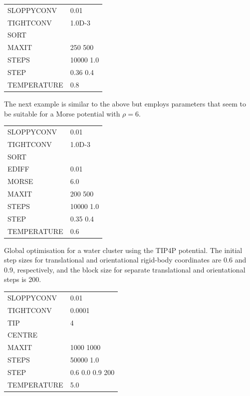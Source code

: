 {\medskip
\begin{tabular}{ll}
SLOPPYCONV & 0.01 \\
TIGHTCONV & 1.0D-3 \\
SORT \\
MAXIT & 250 500 \\
STEPS & 10000 1.0 \\
STEP & 0.36 0.4 \\
TEMPERATURE & 0.8 \\
\end{tabular}
\medskip

\noindent The next example is similar to the above but employs parameters that seem
to be suitable for a Morse potential with $\rho=6$.

\medskip
\begin{tabular}{ll}
SLOPPYCONV & 0.01 \\
TIGHTCONV & 1.0D-3 \\
SORT \\
EDIFF & 0.01\\
MORSE & 6.0\\
MAXIT & 200 500\\
STEPS & 10000 1.0\\
STEP & 0.35 0.4\\
TEMPERATURE & 0.6\\
\end{tabular}
\medskip

\noindent Global optimisation for a water cluster using the TIP4P potential.
The initial step sizes for translational and orientational rigid-body coordinates are
0.6 and 0.9, respectively, and the block size for separate translational and orientational
steps is 200.

\medskip
\begin{tabular}{ll}
SLOPPYCONV & 0.01 \\
TIGHTCONV & 0.0001 \\
TIP & 4 \\
CENTRE & \\
MAXIT & 1000 1000\\
STEPS & 50000 1.0\\
STEP & 0.6 0.0 0.9 200 \\
TEMPERATURE & 5.0\\
\end{tabular}
\medskip

}

